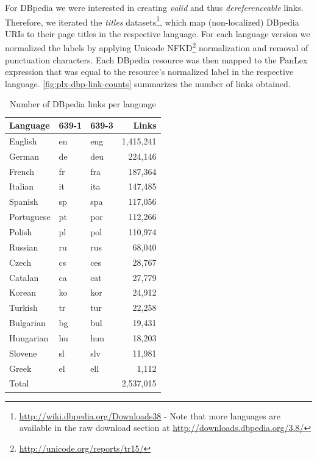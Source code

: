 \documentclass[sw]{iosart2c}
\begin{document}
For DBpedia we were interested in creating \emph{valid} and
thus \emph{dereferenceable} links.
Therefore, we iterated the \emph{titles} datasets\footnote{\url{http://wiki.dbpedia.org/Downloads38} - Note that more languages are available in the raw download section at \url{http://downloads.dbpedia.org/3.8/}},
which map (non-localized) DBpedia URIs to their page titles in the respective language.
For each language version we normalized the labels by applying
Unicode NFKD\footnote{\url{http://unicode.org/reports/tr15/}} normalization and
removal of punctuation characters.
Each DBpedia resource was then mapped to the PanLex expression that was equal to the resource's normalized label in the respective language.
\autoref{fig:plx-dbp-link-counts} summarizes the number of links obtained.
\begin{table}
\centering
\begin{scriptsize}
\begin{tabular}{lllr}
\toprule
Language & 639-1 & 639-3 & Links \\
\midrule
English    & en & eng & 1,415,241 \\
German     & de & deu &   224,146 \\
French     & fr & fra &   187,364 \\
Italian    & it & ita &   147,485 \\
Spanish    & sp & spa &   117,056 \\
Portuguese & pt & por &   112,266 \\
Polish     & pl & pol &   110,974 \\
Russian    & ru & rus &    68,040 \\
Czech      & cs & ces &    28,767 \\
Catalan    & ca & cat &    27,779 \\
Korean     & ko & kor &    24,912 \\
Turkish    & tr & tur &    22,258 \\
Bulgarian  & bg & bul &    19,431 \\
Hungarian  & hu & hun &    18,203 \\
Slovene    & sl & slv &    11,981 \\
Greek      & el & ell &     1,112 \\
\midrule
Total      &    &     & 2,537,015 \\
\bottomrule
\end{tabular}
\end{scriptsize}
\caption{Number of DBpedia links per language}
\label{fig:plx-dbp-link-counts}
\end{table}
\end{document}
